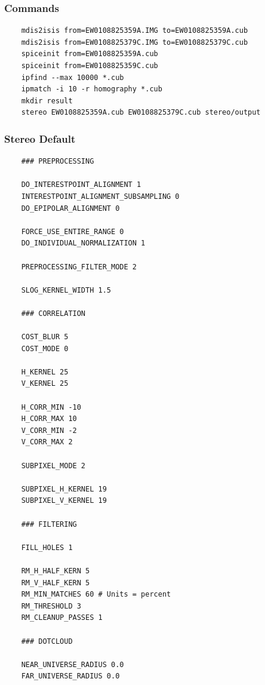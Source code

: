 \subsubsection*{Commands}

\begin{verbatim}
    mdis2isis from=EW0108825359A.IMG to=EW0108825359A.cub
    mdis2isis from=EW0108825379C.IMG to=EW0108825379C.cub
    spiceinit from=EW0108825359A.cub
    spiceinit from=EW0108825359C.cub
    ipfind --max 10000 *.cub
    ipmatch -i 10 -r homography *.cub
    mkdir result
    stereo EW0108825359A.cub EW0108825379C.cub stereo/output
\end{verbatim}

\subsubsection*{Stereo Default}

\begin{verbatim}
    ### PREPROCESSING

    DO_INTERESTPOINT_ALIGNMENT 1
    INTERESTPOINT_ALIGNMENT_SUBSAMPLING 0
    DO_EPIPOLAR_ALIGNMENT 0

    FORCE_USE_ENTIRE_RANGE 0
    DO_INDIVIDUAL_NORMALIZATION 1

    PREPROCESSING_FILTER_MODE 2

    SLOG_KERNEL_WIDTH 1.5

    ### CORRELATION

    COST_BLUR 5
    COST_MODE 0

    H_KERNEL 25
    V_KERNEL 25

    H_CORR_MIN -10
    H_CORR_MAX 10
    V_CORR_MIN -2
    V_CORR_MAX 2

    SUBPIXEL_MODE 2

    SUBPIXEL_H_KERNEL 19
    SUBPIXEL_V_KERNEL 19

    ### FILTERING

    FILL_HOLES 1

    RM_H_HALF_KERN 5
    RM_V_HALF_KERN 5
    RM_MIN_MATCHES 60 # Units = percent
    RM_THRESHOLD 3
    RM_CLEANUP_PASSES 1

    ### DOTCLOUD

    NEAR_UNIVERSE_RADIUS 0.0
    FAR_UNIVERSE_RADIUS 0.0

\end{verbatim}
